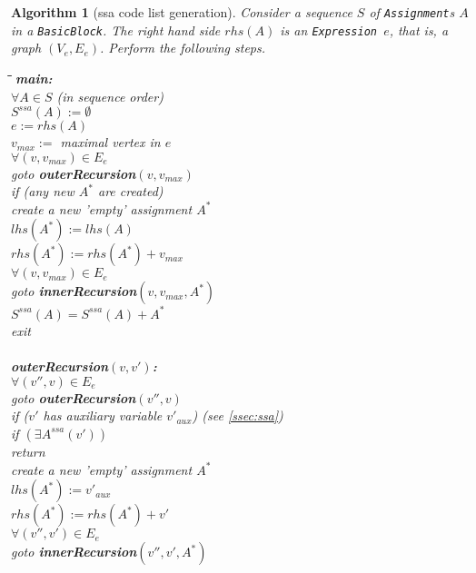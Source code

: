 \documentclass{book}
\newcommand{\Assignment}{{\tt Assignment}}
\newcommand{\BasicBlock}{{\tt BasicBlock}}
\newcommand{\Expression}{{\tt Expression}}
\newtheorem{Alg}{Algorithm}
\begin{document}
\begin{Alg}[ssa code list generation]
Consider a sequence $S$ of {\Assignment}s $A$ in a \BasicBlock. 
The right hand side $rhs(A)$ is an \Expression\ $e$, that is, a graph
$(V_e,E_e)$.
Perform the following steps.
\begin{tabbing}
\hspace*{3ex}\=\hspace*{3ex}\=\hspace*{3ex}\=\hspace*{3ex}\=\hspace*{-13ex}
{\bf main:}\\
\>$\forall  A \in S $ (in sequence order) \\
\>\> $S^{ssa}(A):=\emptyset$ \\
\>\> $e:=rhs(A)$ \\
\>\> $v_{max}:=$ maximal vertex in $e$ \\ 
\>\> $\forall (v,v_{max})\in E_e$ \\
\>\> goto {\bf outerRecursion}$(v,v_{max})$ \\ 
\>\> if (any new $A^*$ are created) \\ 
\>\>\> create a new 'empty' assignment $A^*$\\
\>\>\> $lhs(A^*):=lhs(A)$\\
\>\>\> $rhs(A^*):=rhs(A^*)+v_{max}$\\
\>\>\> $\forall (v,v_{max})\in E_e$ \\
\>\>\>\> goto {\bf innerRecursion}$(v,v_{max},A^*)$ \\ 
\>\>\> $S^{ssa}(A)=S^{ssa}(A)+A^*$ \\
\>exit\\
\\
{\bf outerRecursion$(v,v')$:}\\
\> $\forall (v'',v)\in E_e$ \\
\>\> goto {\bf outerRecursion}$(v'',v)$ \\ 
\> if ($v'$ has auxiliary variable $v'_{aux}$) (see \ref{ssec:ssa}) \\
\>\> if $(\exists A^{ssa}(v'))$\\
\>\>\> return\\
\>\> create a new 'empty' assignment $A^*$\\
\>\> $lhs(A^*):=v'_{aux}$\\
\>\> $rhs(A^*):=rhs(A^*)+v'$\\
\>\> $\forall (v'',v')\in E_e$ \\
\>\>\> goto {\bf innerRecursion}$(v'',v',A^*)$ \\ 

\end{tabbing}
\end{Alg}
\end{document}

